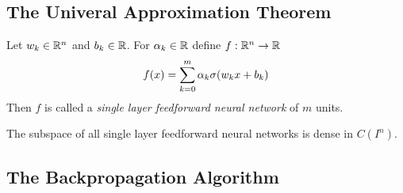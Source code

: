 \subsection{The Univeral Approximation Theorem}

\begin{definition}
    Let \( w_k \in \mathbb{R}^n \) and \( b_k \in \mathbb{R} \). For \( \alpha_k \in \mathbb{R} \) define \( f : \mathbb{R}^n \to \mathbb{R} \)
    \[
        f(x) = \sum_{k = 0}^m \alpha_k \sigma(w_k x + b_k)
    \]
    Then \( f \) is called a \emph{single layer feedforward neural network} of \( m \) units.
\end{definition}
\bigskip

\begin{theorem}\label{thm:universal_approximation}
    The subspace of all single layer feedforward neural networks is dense in \( C(I^n) \).
\end{theorem}



\subsection{The Backpropagation Algorithm}
